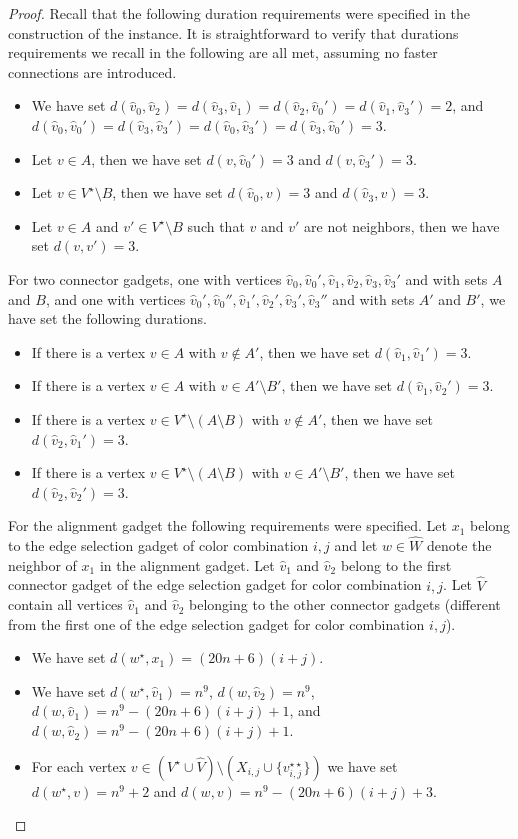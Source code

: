 \documentclass[a4paper,UKenglish,cleveref, autoref, thm-restate, anonymous]{lipics-v2021}
\begin{document}
\begin{proof}
Recall that the following duration requirements were specified in the construction of the instance. It is straightforward to verify that durations requirements we recall in the following are all met, assuming no faster connections are introduced.
\begin{itemize}
    \item We have set $d(\hat{v}_0,\hat{v}_2)=d(\hat{v}_3,\hat{v}_1)=d(\hat{v}_2,\hat{v}_0')=d(\hat{v}_1,\hat{v}_3')=2$, and $d(\hat{v}_0,\hat{v}_0')=d(\hat{v}_3,\hat{v}_3')=d(\hat{v}_0,\hat{v}_3')=d(\hat{v}_3,\hat{v}_0')=3$.
    \item Let $v\in A$, then we have set $d(v,\hat{v}_0')=3$ and $d(v,\hat{v}_3')=3$.
    \item Let $v\in V^\star\setminus B$, then we have set $d(\hat{v}_0,v)=3$ and $d(\hat{v}_3,v)=3$.
    \item Let $v\in A$ and $v'\in V^\star\setminus B$ such that $v$ and $v'$ are not neighbors, then we have set $d(v,v')=3$.
\end{itemize}
For two connector gadgets, one with vertices $\hat{v}_0,\hat{v}_0',\hat{v}_1,\hat{v}_2,\hat{v}_3,\hat{v}_3'$ and with sets $A$ and $B$, and one with vertices $\hat{v}_0',\hat{v}_0'',\hat{v}_1',\hat{v}_2',\hat{v}_3',\hat{v}_3''$ and with sets $A'$ and $B'$, we have set the following durations.
\begin{itemize}
    \item If there is a vertex $v\in A$ with $v\notin A'$, then we have set $d(\hat{v}_1,\hat{v}_1')=3$.
    \item If there is a vertex $v\in A$ with $v\in A'\setminus B'$, then we have set $d(\hat{v}_1,\hat{v}_2')=3$.
    \item If there is a vertex $v\in V^\star\setminus (A\setminus B)$ with $v\notin A'$, then we have set $d(\hat{v}_2,\hat{v}_1')=3$.    
    \item If there is a vertex $v\in V^\star\setminus (A\setminus B)$ with $v\in A'\setminus B'$, then we have set $d(\hat{v}_2,\hat{v}_2')=3$.
\end{itemize}

 For the alignment gadget the following requirements were specified. Let $x_1$ belong to the edge selection gadget of color combination $i,j$ and let $w\in \hat{W}$ denote the neighbor of $x_1$ in the alignment gadget. Let $\hat{v}_1$ and $\hat{v}_2$ belong to the first connector gadget of the edge selection gadget for color combination $i,j$. Let $\hat{V}$ contain all vertices $\hat{v}_1$ and $\hat{v}_2$ belonging to the other connector gadgets (different from the first one of the edge selection gadget for color combination $i,j$). 
\begin{itemize}
    \item We have set $d(w^\star,x_1)=(20n+6)(i+j)$.
    \item We have set $d(w^\star,\hat{v}_1)=n^9$, $d(w,\hat{v}_2)=n^9$, $d(w,\hat{v}_1)=n^9-(20n+6)(i+j)+1$, and $d(w,\hat{v}_2)=n^9-(20n+6)(i+j)+1$.
    \item For each vertex $v\in (V^\star\cup \hat{V})\setminus (X_{i,j}\cup \{v_{i,j}^{\star\star}\})$ we have set $d(w^\star,v)=n^9+2$ and $d(w,v)=n^9-(20n+6)(i+j)+3$.
\end{itemize}


\end{proof}
\end{document}
